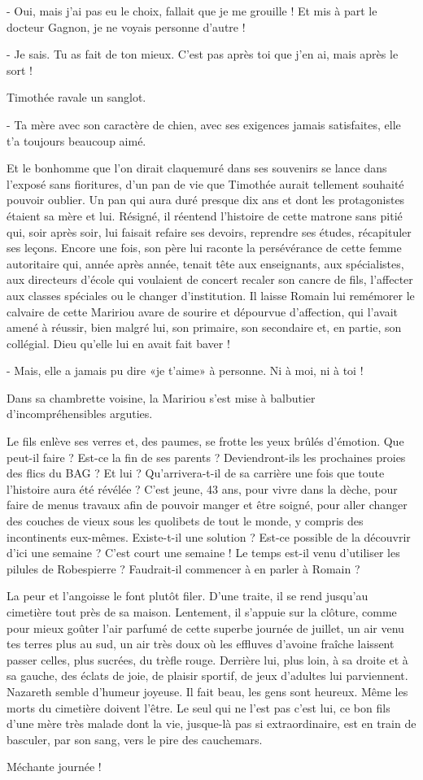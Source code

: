 - Oui, mais j’ai pas eu le choix, fallait que je me grouille ! Et mis à part le docteur Gagnon, je ne voyais personne d’autre !

- Je sais. Tu as fait de ton mieux. C’est pas après toi que j’en ai, mais après le sort !

Timothée ravale un sanglot.

- Ta mère avec son caractère de chien, avec ses exigences jamais satisfaites, elle t’a toujours beaucoup aimé.

Et le bonhomme que l’on dirait claquemuré dans ses souvenirs se lance dans l’exposé sans fioritures, d’un pan de vie que Timothée aurait tellement souhaité pouvoir oublier. Un pan qui aura duré presque dix ans et dont les protagonistes étaient sa mère et lui. Résigné, il réentend l’histoire de cette matrone sans pitié qui, soir après soir, lui faisait refaire ses devoirs, reprendre ses études, récapituler ses leçons. Encore une fois, son père lui raconte la persévérance de cette femme autoritaire qui, année après année, tenait tête aux enseignants, aux spécialistes, aux directeurs d’école qui voulaient de concert recaler son cancre de fils, l’affecter aux classes spéciales ou le changer d’institution. Il laisse Romain lui remémorer le calvaire de cette Maririou avare de sourire et dépourvue d’affection, qui l’avait amené à réussir, bien malgré lui, son primaire, son secondaire et, en partie, son collégial. Dieu qu’elle lui en avait fait baver !

- Mais, elle a jamais pu dire «je t’aime» à personne. Ni à moi, ni à toi !

Dans sa chambrette voisine, la Maririou s’est mise à balbutier d’incompréhensibles arguties.

Le fils enlève ses verres et, des paumes, se frotte les yeux brûlés d’émotion. Que peut-il faire ? Est-ce la fin de ses parents ? Deviendront-ils les prochaines proies des flics du BAG ? Et lui ? Qu’arrivera-t-il de sa carrière une fois que toute l’histoire aura été révélée ? C’est jeune, 43 ans, pour vivre dans la dèche, pour faire de menus travaux afin de pouvoir manger et être soigné, pour aller changer des couches de vieux sous les quolibets de tout le monde, y compris des incontinents eux-mêmes. Existe-t-il une solution ? Est-ce possible de la découvrir d’ici une semaine ? C’est court une semaine ! Le temps est-il venu d’utiliser les pilules de Robespierre ? Faudrait-il commencer à en parler à Romain ?

La peur et l’angoisse le font plutôt filer. D’une traite, il se rend jusqu’au cimetière tout près de sa maison. Lentement, il s’appuie sur la clôture, comme pour mieux goûter l’air parfumé de cette superbe journée de juillet, un air venu tes terres plus au sud, un air très doux où les effluves d’avoine fraîche laissent passer celles, plus sucrées, du trèfle rouge. Derrière lui, plus loin, à sa droite et à sa gauche, des éclats de joie, de plaisir sportif, de jeux d’adultes lui parviennent. Nazareth semble d’humeur joyeuse. Il fait beau, les gens sont heureux. Même les morts du cimetière doivent l’être. Le seul qui ne l’est pas c’est lui, ce bon fils d’une mère très malade dont la vie, jusque-là pas si extraordinaire, est en train de basculer, par son sang, vers le pire des cauchemars.

Méchante journée !